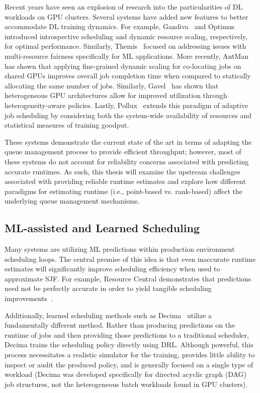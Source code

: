 Recent years have seen an explosion of research into the particularities of DL workloads on GPU clusters. Several systems have added new features to better accommodate DL training dynamics. For example, Gandiva~\cite{xiao2018gandiva} and Optimus~\cite{peng2018optimus} introduced introspective scheduling and dynamic resource scaling, respectively, for optimal performance. Similarly, Themis~\cite{mahajan2020themis} focused on addressing issues with multi-resource fairness specifically for ML applications. More recently, AntMan~\cite{xiao2020antman} has shown that applying fine-grained dynamic scaling for co-locating jobs on shared GPUs improves overall job completion time when compared to statically allocating the same number of jobs. Similarly, Gavel~\cite{narayanan2020heterogeneity} has shown that heterogeneous GPU architectures allow for improved utilization through heterogeneity-aware policies. Lastly, Pollux~\cite{qiao2021pollux} extends this paradigm of adaptive job scheduling by considering both the system-wide availability of resources and statistical measures of training goodput.

These systems demonstrate the current state of the art in terms of adapting the queue management process to provide efficient throughput; however, most of these systems do not account for reliability concerns associated with predicting accurate runtimes. As such, this thesis will examine the upstream challenges associated with providing reliable runtime estimates and explore how different paradigms for estimating runtime (i.e., point-based vs. rank-based) affect the underlying queue management mechanisms.

\subsection{ML-assisted and Learned Scheduling}

Many systems are utilizing ML predictions within production environment scheduling loops. The central premise of this idea is that even inaccurate runtime estimates will significantly improve scheduling efficiency when used to approximate SJF. For example, Resource Central demonstrates that predictions need not be perfectly accurate in order to yield tangible scheduling improvements~\cite{cortez2017resource}.

\clearpage
Additionally, learned scheduling methods such as Decima~\cite{mao2019learning} utilize a fundamentally different method. Rather than producing predictions on the runtime of jobs and then providing those predictions to a traditional scheduler, Decima trains the scheduling policy directly using DRL. Although powerful, this process necessitates a realistic simulator for the training, provides little ability to inspect or audit the produced policy, and is generally focused on a single type of workload (Decima was developed specifically for directed acyclic graph (DAG) job structures, not the heterogeneous batch workloads found in GPU clusters).

